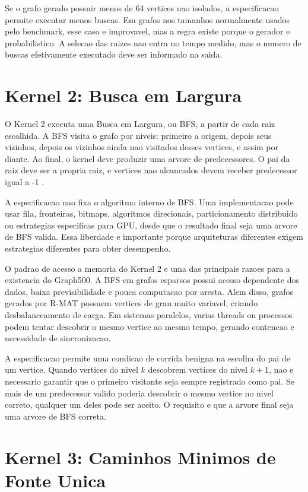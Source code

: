 Se o grafo gerado possuir menos de 64 vertices nao isolados, a especificacao
permite executar menos buscas. Em grafos nos tamanhos normalmente usados pelo
benchmark, esse caso e improvavel, mas a regra existe porque o gerador e
probabilistico. A selecao das raizes nao entra no tempo medido, mas o numero de
buscas efetivamente executado deve ser informado na saida.

\section{Kernel 2: Busca em Largura}

O Kernel 2 executa uma Busca em Largura, ou BFS, a partir de cada raiz escolhida.
A BFS visita o grafo por niveis: primeiro a origem, depois seus vizinhos, depois
os vizinhos ainda nao visitados desses vertices, e assim por diante. Ao final, o
kernel deve produzir uma arvore de predecessores. O pai da raiz deve ser a
propria raiz, e vertices nao alcancados devem receber predecessor igual a -1
\cite{graph500spec, cormenalgorithms}.

A especificacao nao fixa o algoritmo interno de BFS. Uma implementacao pode usar
fila, fronteiras, bitmaps, algoritmos direcionais, particionamento distribuido ou
estrategias especificas para GPU, desde que o resultado final seja uma arvore de
BFS valida. Essa liberdade e importante porque arquiteturas diferentes exigem
estrategias diferentes para obter desempenho.

O padrao de acesso a memoria do Kernel 2 e uma das principais razoes para a
existencia do Graph500. A BFS em grafos esparsos possui acesso dependente dos
dados, baixa previsibilidade e pouca computacao por aresta. Alem disso, grafos
gerados por R-MAT possuem vertices de grau muito variavel, criando
desbalanceamento de carga. Em sistemas paralelos, varias threads ou processos
podem tentar descobrir o mesmo vertice ao mesmo tempo, gerando contencao e
necessidade de sincronizacao.

A especificacao permite uma condicao de corrida benigna na escolha do pai de um
vertice. Quando vertices do nivel $k$ descobrem vertices do nivel $k+1$, nao e
necessario garantir que o primeiro visitante seja sempre registrado como pai. Se
mais de um predecessor valido poderia descobrir o mesmo vertice no nivel correto,
qualquer um deles pode ser aceito. O requisito e que a arvore final seja uma
arvore de BFS correta.

\section{Kernel 3: Caminhos Minimos de Fonte Unica}

